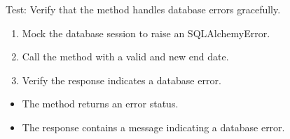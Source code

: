 \documentclass[letterpaper,10pt,english]{sphinxmanual}
\begin{document}
\begin{fulllineitems}
\label{\detokenize{test:test.test_alarm.test_update_alarm_end_date_database_error}}
\pysigstartsignatures
\pysiglinewithargsret
{}
{\sphinxparamcomma {}}
{}
\pysigstopsignatures
\sphinxAtStartPar
Test: Verify that the method handles database errors gracefully.
\begin{description}
\begin{enumerate}
%
\item {} 
\sphinxAtStartPar
Mock the database session to raise an SQLAlchemyError.

\item {} 
\sphinxAtStartPar
Call the  method with a valid  and new end date.

\item {} 
\sphinxAtStartPar
Verify the response indicates a database error.

\end{enumerate}

\begin{itemize}
\item {} 
\sphinxAtStartPar
The method returns an error status.

\item {} 
\sphinxAtStartPar
The response contains a message indicating a database error.

\end{itemize}

\end{description}

\end{fulllineitems}

\end{document}
